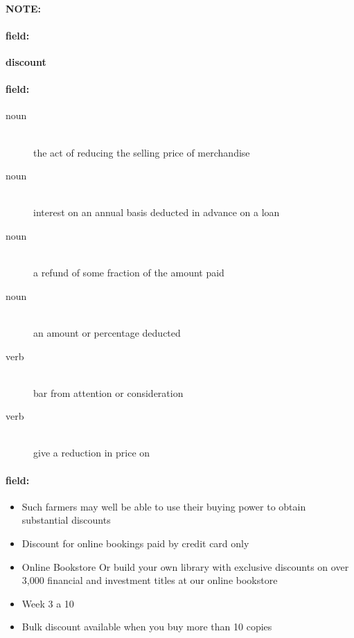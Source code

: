 \documentclass[12pt]{article}
\newenvironment{note}{\paragraph{NOTE:}}{}
\newenvironment{field}{\paragraph{field:}}{}
\begin{document}
\begin{note}
\begin{field}
\textbf{\large discount}
\end{field}


\begin{field}
\begin{description}
\item[noun] \hfill \\ 
the act of reducing the selling price of merchandise

\item[noun] \hfill \\ 
interest on an annual basis deducted in advance on a loan

\item[noun] \hfill \\ 
a refund of some fraction of the amount paid

\item[noun] \hfill \\ 
an amount or percentage deducted

\item[verb] \hfill \\ 
bar from attention or consideration

\item[verb] \hfill \\ 
give a reduction in price on

\end{description}
\end{field}

\begin{field}
\begin{itemize}
\item Such farmers may well be able to use their buying power to obtain substantial discounts
\item Discount for online bookings paid by credit card only
\item Online Bookstore Or build your own library with exclusive discounts on over 3,000 financial and investment titles at our online bookstore
\item Week 3 a 10 %
\item Bulk discount available when you buy more than 10 copies
\end{itemize}
\end{field}
\end{note}
\end{document}
